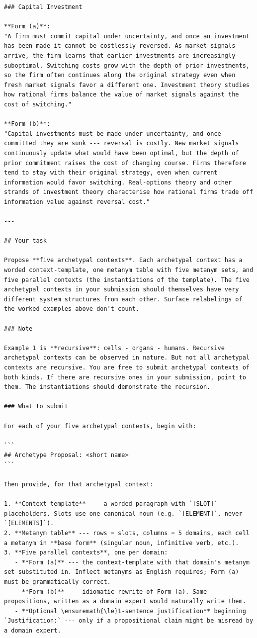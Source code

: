 \documentclass{article}
\begin{document}
\begin{lstlisting}
### Capital Investment

**Form (a)**:
"A firm must commit capital under uncertainty, and once an investment has been made it cannot be costlessly reversed. As market signals arrive, the firm learns that earlier investments are increasingly suboptimal. Switching costs grow with the depth of prior investments, so the firm often continues along the original strategy even when fresh market signals favor a different one. Investment theory studies how rational firms balance the value of market signals against the cost of switching."

**Form (b)**:
"Capital investments must be made under uncertainty, and once committed they are sunk --- reversal is costly. New market signals continuously update what would have been optimal, but the depth of prior commitment raises the cost of changing course. Firms therefore tend to stay with their original strategy, even when current information would favor switching. Real-options theory and other strands of investment theory characterise how rational firms trade off information value against reversal cost."

---

## Your task

Propose **five archetypal contexts**. Each archetypal context has a worded context-template, one metanym table with five metanym sets, and five parallel contexts (the instantiations of the template). The five archetypal contexts in your submission should themselves have very different system structures from each other. Surface relabelings of the worked examples above don't count.

### Note

Example 1 is **recursive**: cells - organs - humans. Recursive archetypal contexts can be observed in nature. But not all archetypal contexts are recursive. You are free to submit archetypal contexts of both kinds. If there are recursive ones in your submission, point to them. The instantiations should demonstrate the recursion.

### What to submit

For each of your five archetypal contexts, begin with:

```
## Archetype Proposal: <short name>
```

Then provide, for that archetypal context:

1. **Context-template** --- a worded paragraph with `[SLOT]` placeholders. Slots use one canonical noun (e.g. `[ELEMENT]`, never `[ELEMENTS]`).
2. **Metanym table** --- rows = slots, columns = 5 domains, each cell a metanym in **base form** (singular noun, infinitive verb, etc.).
3. **Five parallel contexts**, one per domain:
   - **Form (a)** --- the context-template with that domain's metanym set substituted in. Inflect metanyms as English requires; Form (a) must be grammatically correct.
   - **Form (b)** --- idiomatic rewrite of Form (a). Same propositions, written as a domain expert would naturally write them.
   - **Optional \ensuremath{\le}1-sentence justification** beginning `Justification:` --- only if a propositional claim might be misread by a domain expert.


\end{lstlisting}
\end{document}
